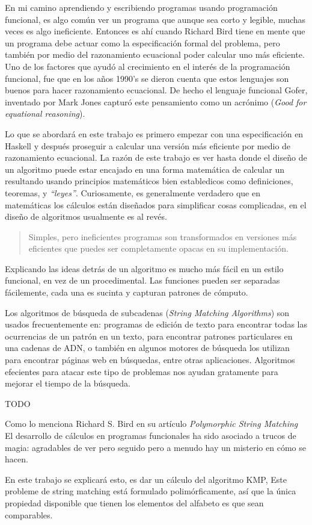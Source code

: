 En mi camino aprendiendo y escribiendo programas usando programación funcional, es algo común ver un programa
que aunque sea corto y legible, muchas veces es algo ineficiente. Entonces es ahí cuando Richard Bird tiene
en mente que un programa debe actuar como la especificación formal del problema, pero también por medio del
razonamiento ecuacional poder calcular uno más eficiente.
Uno de los factores que ayudó al crecimiento en el interés de la programación funcional, fue que en los años
1990's se dieron cuenta que estos lenguajes son buenos para hacer razonamiento ecuacional.
De hecho el lenguaje funcional Gofer, inventado por Mark Jones capturó este pensamiento como un acrónimo 
(\textit{Good for equational reasoning}).
\newline

Lo que se abordará en este trabajo es primero empezar con una especificación en Haskell y después proseguir a
calcular una versión más eficiente por medio de razonamiento ecuacional.
La razón de este trabajo es ver hasta donde el diseño de un algoritmo puede estar encajado en una forma
matemática de calcular un resultando usando principios matemáticos bien establedicos como definiciones, 
teoremas, y \textit{``leyes''}.
Curiosamente, es generalmente verdadero que en matemáticas los cálculos están diseñados para simplificar
cosas complicadas, en el diseño de algoritmos usualmente es al revés.
\begin{quote}
Simples, pero ineficientes programas son transformados en versiones más eficientes que puedes ser
completamente opacas en su implementación.
\end{quote}
Explicando las ideas detrás de un algoritmo es mucho más fácil en un estilo funcional, en vez de un
procedimental. Las funciones pueden ser separadas fácilemente, cada una es sucinta y capturan patrones
de cómputo.
\newline

Los algoritmos de búsqueda de subcadenas (\textit{String Matching Algorithms}) son usados frecuentemente en:
programas de edición de texto para encontrar todas las ocurrencias de un patrón en un texto, para encontrar
patrones particulares en una cadenas de ADN, o también en algunos motores de búsqueda los utilizan para
encontrar páginas web en búsquedas, entre otras aplicaciones. Algoritmos efecientes para atacar este tipo de
problemas nos ayudan gratamente para mejorar el tiempo de la búsqueda.
\newline

TODO

Como lo menciona Richard S. Bird en su artículo \emph{Polymorphic String Matching}\cite{book:1505279}
El desarrollo de cálculos en programas funcionales ha sido asociado a trucos de magia: agradables de ver pero seguido pero a menudo hay un misterio en cómo se hacen.

En este trabajo se explicará esto, es dar un cálculo del algoritmo KMP,
Este probleme de string matching está formulado polimórficamente, así que la única propiedad disponible que tienen los elementos del alfabeto es que sean comparables.

